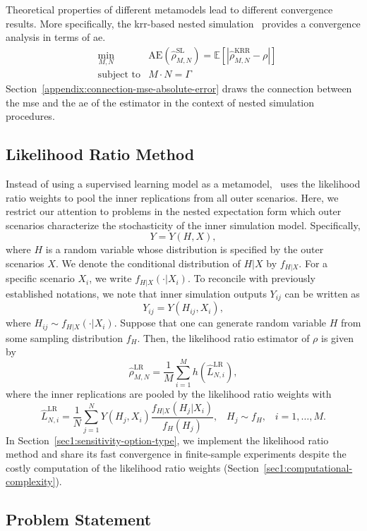 Theoretical properties of different metamodels lead to different convergence results.
More specifically, the \gls{krr}-based nested simulation~\citep{wang2022smooth} provides a convergence analysis in terms of \gls{ae}.
\begin{align}\label{eq1:ae}
    & \min_{M, N}  & \text{AE}(\hat{\rho}^{\text{SL}}_{M, N}) = \mathbb{E} \left[ \left| \hat{\rho}^{\text{KRR}}_{M, N} - \rho \right| \right] \nonumber \\
    & \text{subject to} & M \cdot N = \Gamma
\end{align}
Section~\ref{appendix:connection-mse-absolute-error} draws the connection between the \gls{mse} and the \gls{ae} of the estimator in the context of nested simulation procedures.

\subsection{Likelihood Ratio Method}

Instead of using a supervised learning model as a metamodel,~\cite{zhang2022sample} uses the likelihood ratio weights to pool the inner replications from all outer scenarios.
Here, we restrict our attention to problems in the nested expectation form which outer scenarios characterize the stochasticity of the inner simulation model. 
Specifically,
$$ Y = Y(H, X), $$
where $H$ is a random variable whose distribution is specified by the outer scenarios $X$. 
We denote the conditional distribution of $H|X$ by $f_{H|X}$. 
For a specific scenario $X_i$, we write $f_{H|X}(\cdot |X_i)$. 
To reconcile with previously established notations, we note that inner simulation outputs $Y_{ij}$ can be written as
$$ Y_{ij} = Y(H_{ij}, X_i), $$
where $H_{ij} \sim f_{H|X}(\cdot |X_i)$.
Suppose that one can generate random variable $H$ from some sampling
distribution $f_H$. Then, the likelihood ratio estimator of $\rho$ is given by
$$\hat{\rho}^{\text{LR}}_{M,N} = \frac{1}{M} \sum_{i=1}^M h(\hat{L}^{\text{LR}}_{N, i}), $$ where the inner replications are pooled by the likelihood ratio weights with
$$\hat{L}^{\text{LR}}_{N, i} = \frac{1}{N} \sum_{j=1}^N Y(H_j, X_i) \frac{f_{H|X}(H_{j}|X_i)}{f_H(H_{j})}, \;\;\; H_j \sim f_H, \;\;\; i=1, \dots, M.$$
In Section~\ref{sec1:sensitivity-option-type}, we implement the likelihood ratio method and share its fast convergence in finite-sample experiments despite the costly computation of the likelihood ratio weights (Section~\ref{sec1:computational-complexity}).

\subsection{Problem Statement}

